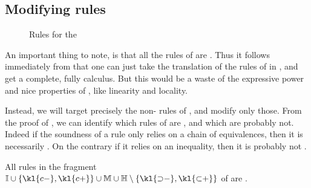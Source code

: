 \subsection{Modifying rules}

\begin{scope}

\begin{figure*}
  
  \caption{Rules for the   }
\end{figure*}

An important thing to note, is that all the rules of  are
\emph{}. Thus it follows immediately from
 that one can just take the translation of the rules
of  in , and get a complete, fully 
calculus. But this would be a waste of the expressive power and nice properties
of , like linearity and locality.

Instead, we will target precisely the non- rules of ,
and modify only those. From the proof of , we
can identify which rules of  are , and which are
probably not. Indeed if the soundness of a rule only relies on a chain of
equivalences, then it is necessarily . On the contrary if it relies on
an inequality, then it is probably not .

\begin{fact}
  All rules in the fragment $\mathbb{I} \cup \{\kl{c{-}},\kl{c{+}}\} \cup
    \mathbb{M} \cup \mathbb{H} \setminus \{\kl{{\limp}{-}},\kl{{\lsub}{+}}\}$ of
   are .
\end{fact}


\end{scope}
